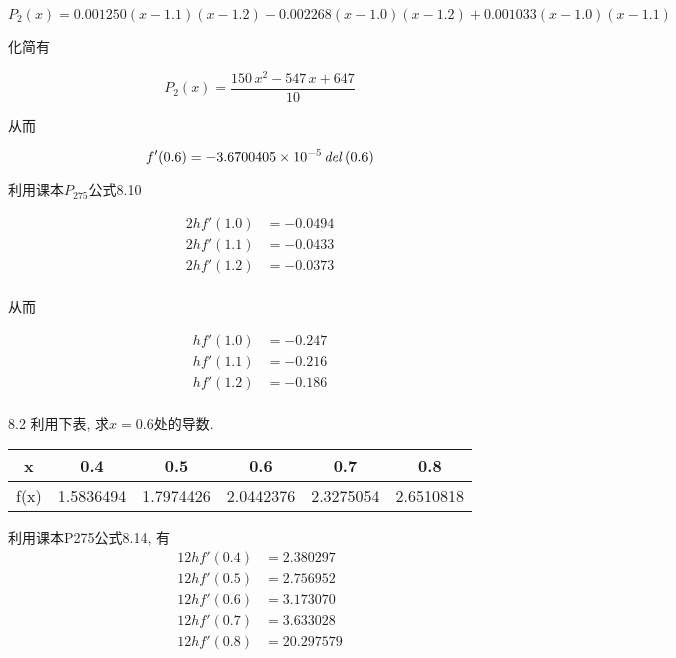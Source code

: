 \documentclass[a4paper, 10pt]{article}
\begin{document}
\begin{CJK}{UTF8}{gbsn}
\begin{equation*}
	P_2(x) = 0.001250(x-1.1)(x-1.2) - 0.002268(x-1.0)(x-1.2) + 0.001033(x-1.0)(x-1.1)
\end{equation*}

化简有

\begin{equation*}
	P_2(x) = \frac{150\,x^2-547\,x+647}{10}
\end{equation*}

从而

\begin{equation*}
	f'(0.6) = -3.6700405 \times 10^{-5}\,{\it del}\left(0.6\right)
\end{equation*}

利用课本$P_{275}$公式8.10

\begin{align*}
	2hf'(1.0) & = -0.0494 \\
	2hf'(1.1) & = -0.0433 \\
	2hf'(1.2) & = -0.0373 \\
\end{align*}

从而

\begin{align*}
	hf'(1.0) & = -0.247 \\
	hf'(1.1) & = -0.216 \\
	hf'(1.2) & = -0.186 \\
\end{align*}

8.2
利用下表, 求$x=0.6$处的导数.\\

\begin{tabular}{c| c c c c c}
\hline
x    & 0.4       & 0.5       & 0.6       & 0.7       & 0.8 \\
\hline
f(x) & 1.5836494 & 1.7974426 & 2.0442376 & 2.3275054 & 2.6510818 \\
\hline
\end{tabular}

利用课本P275公式8.14, 有 \\

\begin{align*}
	12hf'(0.4) & =  2.380297 \\
	12hf'(0.5) & =  2.756952 \\
	12hf'(0.6) & =  3.173070 \\
	12hf'(0.7) & =  3.633028 \\
	12hf'(0.8) & = 20.297579 \\
\end{align*}


\end{CJK}
\end{document}
